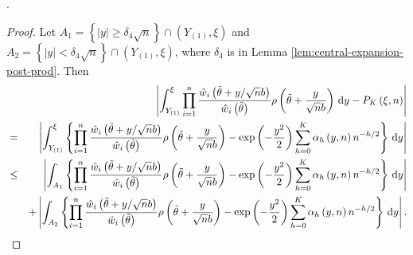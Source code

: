 . 
\begin{proof}
Let $A_{1}=\left\{ \left|y\right|\ge\delta_{4}\sqrt{n}\right\} \cap\left(Y_{\left(1\right)},\xi\right)$
and $A_{2}=\left\{ \left|y\right|<\delta_{4}\sqrt{n}\right\} \cap\left(Y_{\left(1\right)},\xi\right)$,
where $\delta_{4}$ is in Lemma \ref{lem:central-expansion-post-prod}.
Then 
\begin{eqnarray*}
 &  & \left|\int_{Y_{\left(1\right)}}^{\xi}\prod_{i=1}^{n}\frac{\hat{w}_{i}\left(\tilde{\theta}+y/\sqrt{n}b\right)}{\hat{w}_{i}\left(\tilde{\theta}\right)}\rho\left(\tilde{\theta}+\frac{y}{\sqrt{n}b}\right)\,\mathrm{d} y-P_{K}\left(\xi,n\right)\right|\\
 & = & \left|\int_{Y_{\left(1\right)}}^{\xi}\left\{ \prod_{i=1}^{n}\frac{\hat{w}_{i}\left(\tilde{\theta}+y/\sqrt{n}b\right)}{\hat{w}_{i}\left(\tilde{\theta}\right)}\rho\left(\tilde{\theta}+\frac{y}{\sqrt{n}b}\right)-\exp\left(-\frac{y^{2}}{2}\right)\sum_{h=0}^{K}\alpha_{h}\left(y,n\right)n^{-h/2}\right\} \,\mathrm{d} y\right|\\
 & \le & \left|\int_{A_{1}}\left\{ \prod_{i=1}^{n}\frac{\hat{w}_{i}\left(\tilde{\theta}+y/\sqrt{n}b\right)}{\hat{w}_{i}\left(\tilde{\theta}\right)}\rho\left(\tilde{\theta}+\frac{y}{\sqrt{n}b}\right)-\exp\left(-\frac{y^{2}}{2}\right)\sum_{h=0}^{K}\alpha_{h}\left(y,n\right)n^{-h/2}\right\} \,\mathrm{d} y\right|\\
 &  & +\left|\int_{A_{2}}\left\{ \prod_{i=1}^{n}\frac{\hat{w}_{i}\left(\tilde{\theta}+y/\sqrt{n}b\right)}{\hat{w}_{i}\left(\tilde{\theta}\right)}\rho\left(\tilde{\theta}+\frac{y}{\sqrt{n}b}\right)-\exp\left(-\frac{y^{2}}{2}\right)\sum_{h=0}^{K}\alpha_{h}\left(y,n\right)n^{-h/2}\right\} \,\mathrm{d} y\right|.
\end{eqnarray*}



\end{proof}

